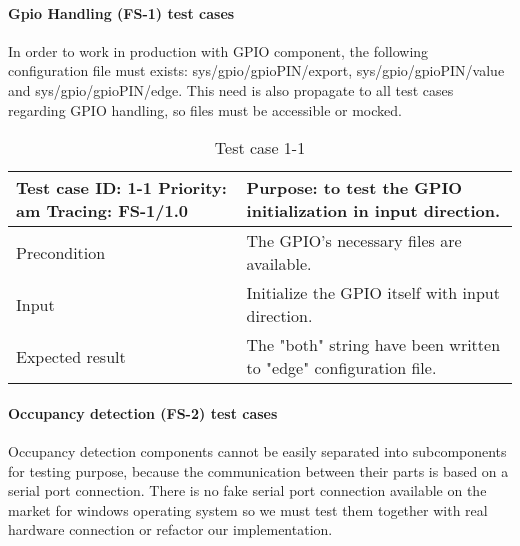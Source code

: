\paragraph{Gpio Handling (FS-1) test cases} In order to work in production with GPIO component, the following configuration file must exists: sys/gpio/gpioPIN/export, sys/gpio/gpioPIN/value and sys/gpio/gpioPIN/edge. This need is also propagate to all test cases regarding GPIO handling, so files must be accessible or mocked.
\begin{table}[H]
	\caption{Test case 1-1}
	\label{table:TCase-FS1-01}
	\begin{center}
		\renewcommand{\arraystretch}{1.8}
		\begin{tabu} 
			to 0.9 \textwidth
			{  X[0.4, c] X[c] }
			\toprule
			Test case ID: 1-1 \newline Priority: am \newline Tracing: FS-1/1.0 & Purpose: to test the GPIO initialization in input direction.       \\ \midrule
			Precondition                                                       & The GPIO's necessary files are available.                          \\
			Input                                                              & Initialize the GPIO itself with input direction.                  \\
			Expected result                                                    & The "both" string have been written to "edge" configuration file. \\ \bottomrule
		\end{tabu}
	\end{center}
\end{table}

\paragraph{Occupancy detection (FS-2) test cases} Occupancy detection components cannot be easily separated into subcomponents for testing purpose, because the communication between their parts is based on a serial port connection. There is no fake serial port connection  available on the market for windows operating system so we must test them together with real hardware connection or refactor our implementation.

